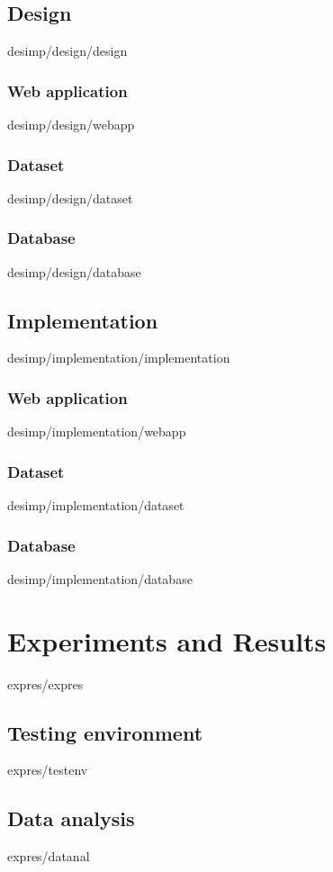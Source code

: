 \documentclass[english,epsbased,copyright,final,printable,covers,extendedindex,firstnumbered,tfg,gnuplot,loc,loe,lof,lot]{tfgtfmthesisuam}
\begin{document}
    \section{Design\label{SEC:DESIGN}}{desimp/design/design}
      \subsection{Web application\label{SS:WEBAPP_DES}}{desimp/design/webapp}
      \subsection{Dataset\label{SS:DATASET_DES}}{desimp/design/dataset}
      \newpage
      \subsection{Database\label{SS:DATABASE_DES}}{desimp/design/database}
    \section{Implementation\label{SEC:IMPLEMENTATION}}{desimp/implementation/implementation}
      \subsection{Web application\label{SS:WEBAPP_IMP}}{desimp/implementation/webapp}
      \subsection{Dataset\label{SS:DATASET_IMP}}{desimp/implementation/dataset}
      \subsection{Database\label{SS:DATABASE_IMP}}{desimp/implementation/database}

  \chapter{Experiments and Results\label{CAP:EXPRES}}{expres/expres}
    \section{Testing environment\label{SEC:TESTENV}}{expres/testenv}
    \section{Data analysis\label{SEC:DATANAL}}{expres/datanal}
\end{document}
